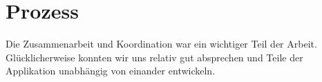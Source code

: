 \section{Prozess}
Die Zusammenarbeit und Koordination war ein wichtiger Teil der Arbeit. Glücklicherweise konnten wir uns relativ gut absprechen und Teile der Applikation unabhängig von einander entwickeln. 



